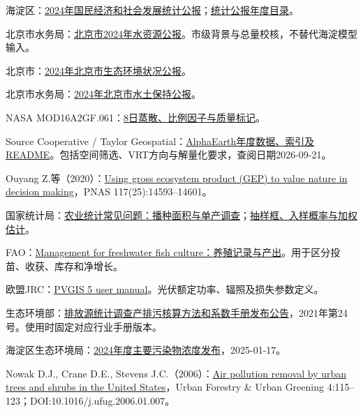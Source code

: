 \documentclass[12pt,a4paper,fontset=fandol]{ctexart}
\begin{document}
\begin{enumerate}[label={[\arabic*]}]
\item 海淀区：\href{https://zyk.bjhd.gov.cn/sjkf/tjgb/202504/t20250423_4766489.shtml}{2024年国民经济和社会发展统计公报}；\href{https://zyk.bjhd.gov.cn/sjkf/tjgb/}{统计公报年度目录}。
\item 北京市水务局：\href{https://swj.beijing.gov.cn/zwgk/szygb/202504/P020250428362976968562.pdf}{北京市2024年水资源公报}。市级背景与总量校核，不替代海淀模型输入。
\item 北京市：\href{https://www.beijing.gov.cn/ywdt/zwzt/jjjxtfz/cg/sthjbh/gb/202505/P020250520406072608853.pdf}{2024年北京市生态环境状况公报}。
\item 北京市水务局：\href{https://swj.beijing.gov.cn/zwgk/stbcgb/202505/P020250526402026040857.pdf}{2024年北京市水土保持公报}。
\item NASA MOD16A2GF.061：\href{https://developers.google.com/earth-engine/datasets/catalog/MODIS_061_MOD16A2GF}{8日蒸散、比例因子与质量标记}。
\item Source Cooperative / Taylor Geospatial：\href{https://source.coop/tge-labs/aef}{AlphaEarth年度数据、索引及README}。包括空间筛选、VRT方向与解量化要求，查阅日期2026-09-21。
\item Ouyang Z.等（2020）：\href{https://doi.org/10.1073/pnas.1911439117}{Using gross ecosystem product (GEP) to value nature in decision making}，PNAS 117(25):14593--14601。
\item 国家统计局：\href{https://www.stats.gov.cn/hd/cjwtjd/202302/t20230207_1902270.html}{农业统计常见问题：播种面积与单产调查}；\href{https://www.stats.gov.cn/zs/tjws/tjdc/202301/t20230101_1903786.html}{抽样框、入样概率与加权估计}。
\item FAO：\href{https://www.fao.org/fishery/static/FAO_Training/FAO_Training/General/x6709e/x6709e16.htm}{Management for freshwater fish culture：养殖记录与产出}。用于区分投苗、收获、库存和净增长。
\item 欧盟JRC：\href{https://joint-research-centre.ec.europa.eu/photovoltaic-geographical-information-system-pvgis/using-pvgis-5/pvgis-5-user-manual_en}{PVGIS 5 user manual}。光伏额定功率、辐照及损失参数定义。
\item 生态环境部：\href{https://www.mee.gov.cn/xxgk2018/xxgk/xxgk01/202106/t20210618_839512.html}{排放源统计调查产排污核算方法和系数手册发布公告}，2021年第24号。使用时固定对应行业手册版本。
\item 海淀区生态环境局：\href{https://zyk.bjhd.gov.cn/ztzl/hjbh/hjbhxw/202501/t20250117_4754538_m.shtml}{2024年度主要污染物浓度发布}，2025-01-17。
\item Nowak D.J., Crane D.E., Stevens J.C.（2006）：\href{https://research.fs.usda.gov/treesearch/14743}{Air pollution removal by urban trees and shrubs in the United States}，Urban Forestry \& Urban Greening 4:115--123；DOI:10.1016/j.ufug.2006.01.007。

\end{enumerate}
\end{document}
